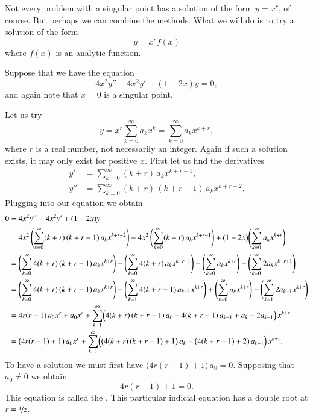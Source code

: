 \documentclass[12pt]{book}
\begin{document}
Not every problem with a singular point has a solution of the form $y=x^r$, of
course.  But perhaps we can combine the methods.  What we will do is
to try a solution of the form
\begin{equation*}
y = x^r f(x)
\end{equation*}
where $f(x)$ is an analytic function.

\begin{example}
Suppose that we have the equation
\begin{equation*}
4 x^2 y'' - 4 x^2 y' + (1-2x)y = 0,
\end{equation*}
and again note that $x=0$ is a singular point.

Let us try
\begin{equation*}
y = x^r \sum_{k=0}^\infty a_k x^k
= \sum_{k=0}^\infty a_k x^{k+r} ,
\end{equation*}
where $r$ is a real number, not necessarily an integer.
Again if such a solution exists, it may only exist for positive $x$.
First let us find the derivatives
\begin{align*}
y' & = \sum_{k=0}^\infty (k+r)\, a_k x^{k+r-1} , \\
y'' & = \sum_{k=0}^\infty (k+r)\,(k+r-1)\, a_k x^{k+r-2} .
\end{align*}
Plugging into our equation we obtain
\begin{equation*}
\begin{split}
0 & = 4x^2y''-4x^2y'+(1-2x)y
\\
&= 
4x^2 \, \Biggl( \sum_{k=0}^\infty (k+r)\,(k+r-1) \, a_k x^{k+r-2}  \Biggr)
-
4x^2 \, \Biggl( \sum_{k=0}^\infty (k+r) \, a_k x^{k+r-1}  \Biggr)
+
(1-2x)
\Biggl( \sum_{k=0}^\infty a_k x^{k+r} \Biggr)
\\
&=
\Biggl( \sum_{k=0}^\infty 4 (k+r)\,(k+r-1) \, a_k x^{k+r}  \Biggr)
-
\Biggl( \sum_{k=0}^\infty 4 (k+r) \, a_k x^{k+r+1}  \Biggr)
+
\Biggl( \sum_{k=0}^\infty a_k x^{k+r} \Biggr)
-
\Biggl( \sum_{k=0}^\infty 2a_k x^{k+r+1} \Biggr)
\\
&=
\Biggl( \sum_{k=0}^\infty 4 (k+r)\,(k+r-1) \, a_k x^{k+r}  \Biggr)
-
\Biggl( \sum_{k=1}^\infty 4 (k+r-1) \, a_{k-1} x^{k+r}  \Biggr)
+
\Biggl( \sum_{k=0}^\infty a_k x^{k+r} \Biggr)
-
\Biggl( \sum_{k=1}^\infty 2a_{k-1} x^{k+r} \Biggr)
\\
&=
4r(r-1) \, a_0 x^r  + a_0 x^r + 
\sum_{k=1}^\infty
\Bigl( 4 (k+r)\,(k+r-1) \, a_k
-
4 (k+r-1) \, a_{k-1}
+
a_k
-
2a_{k-1} \Bigr) \, x^{k+r} 
\\
&=
\bigl( 4r(r-1) + 1 \bigr) \, a_0 x^r + 
\sum_{k=1}^\infty
\Bigl( \bigl( 4 (k+r)\,(k+r-1) + 1 \bigr) \, a_k
-
\bigl( 4 (k+r-1) + 2 \bigr) \, a_{k-1} \Bigr) \, x^{k+r} .
\end{split}
\end{equation*}
To have a solution we must first have
$\bigl( 4r(r-1) + 1 \bigr) \, a_0 = 0$.  Supposing that $a_0 \not= 0$
we obtain 
\begin{equation*}
4r(r-1) + 1 = 0 .
\end{equation*}
This equation is called the \emph{}.
This particular indicial
equation has a double root at $r = \nicefrac{1}{2}$.


\end{example}
\end{document}
